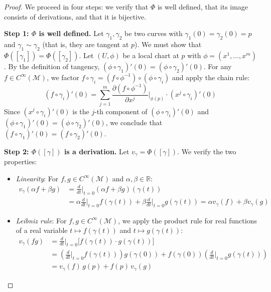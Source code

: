 \begin{proof}
We proceed in four steps: we verify that $\Phi$ is well defined, that its image consists of derivations, and that it is bijective.

\textbf{Step 1: $\Phi$ is well defined.} Let $\gamma_1, \gamma_2$ be two curves with $\gamma_1(0) = \gamma_2(0) = p$ and $\gamma_1 \sim \gamma_2$ (that is, they are tangent at $p$). We must show that $\Phi([\gamma_1]) = \Phi([\gamma_2])$. Let $(U, \phi)$ be a local chart at $p$ with $\phi = (x^1, \ldots, x^m)$. By the definition of tangency, $(\phi \circ \gamma_1)'(0) = (\phi \circ \gamma_2)'(0)$. For any $f \in C^\infty(\mathcal{M})$, we factor $f \circ \gamma_i = (f \circ \phi^{-1}) \circ (\phi \circ \gamma_i)$ and apply the chain rule:
\[
(f \circ \gamma_i)'(0) = \sum_{j=1}^{m} \frac{\partial (f \circ \phi^{-1})}{\partial x^j}\bigg|_{\phi(p)} \cdot (x^j \circ \gamma_i)'(0)
\]
Since $(x^j \circ \gamma_i)'(0)$ is the $j$-th component of $(\phi \circ \gamma_i)'(0)$ and $(\phi \circ \gamma_1)'(0) = (\phi \circ \gamma_2)'(0)$, we conclude that $(f \circ \gamma_1)'(0) = (f \circ \gamma_2)'(0)$.

\textbf{Step 2: $\Phi([\gamma])$ is a derivation.} Let $v_\gamma = \Phi([\gamma])$. We verify the two properties:
\begin{itemize}
    \item \textit{Linearity}: For $f, g \in C^\infty(\mathcal{M})$ and $\alpha, \beta \in \mathbb{R}$:
    \begin{align*}
    v_\gamma(\alpha f + \beta g) &= \frac{d}{dt}\bigg|_{t=0} (\alpha f + \beta g)(\gamma(t)) \\
    &= \alpha \frac{d}{dt}\bigg|_{t=0} f(\gamma(t)) + \beta \frac{d}{dt}\bigg|_{t=0} g(\gamma(t)) = \alpha v_\gamma(f) + \beta v_\gamma(g)
    \end{align*}
    \item \textit{Leibniz rule}: For $f, g \in C^\infty(\mathcal{M})$, we apply the product rule for real functions of a real variable $t \mapsto f(\gamma(t))$ and $t \mapsto g(\gamma(t))$:
    \begin{align*}
    v_\gamma(fg) &= \frac{d}{dt}\bigg|_{t=0} \bigl[f(\gamma(t)) \cdot g(\gamma(t))\bigr] \\
    &= \left(\frac{d}{dt}\bigg|_{t=0} f(\gamma(t))\right) g(\gamma(0)) + f(\gamma(0)) \left(\frac{d}{dt}\bigg|_{t=0} g(\gamma(t))\right) \\
    &= v_\gamma(f) \, g(p) + f(p) \, v_\gamma(g)
    \end{align*}
\end{itemize}


\end{proof}
